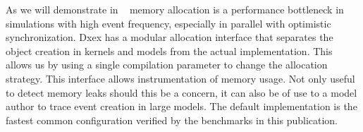 As we will demonstrate in ~ memory allocation is a performance bottleneck in simulations with high event frequency, especially in parallel with optimistic synchronization. Dxex has a modular allocation interface that separates the object creation in kernels and models from the actual implementation. This allows us by using a single compilation parameter to change the allocation strategy. This interface allows instrumentation of memory usage. Not only useful to detect memory leaks should this be a concern, it can also be of use to a model author to trace event creation in large models. The default implementation is the fastest common configuration verified by the benchmarks in this publication.
